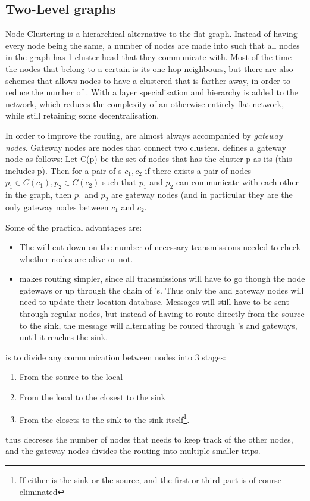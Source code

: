\subsection{Two-Level graphs}
\label{cluster methods}
Node Clustering is a hierarchical alternative to the flat graph. Instead of having every node being the same, a number of nodes are made into \ch such that all nodes in the graph has 1 cluster head that they communicate with. Most of the time the nodes that belong to a certain \ch is its one-hop neighbours, but there are also schemes that allows nodes to have a clustered that is farther away, in order to reduce the number of \ch. With \ch a layer specialisation and hierarchy is added to the network, which reduces the complexity of an otherwise entirely flat network, while still retaining some decentralisation.

In order to improve the routing, \ch are almost always accompanied by \emph{gateway nodes}. Gateway nodes are nodes that connect two clusters. \cite{spanners} defines a gateway node as follows:
Let C(p) be the set of nodes that has the cluster p as its \ch (this includes p). Then for a pair of \ch s $c_1, c_2$ if there exists a pair of nodes $p_1 \in C(c_1), p_2 \in C(c_2)$ such that $p_1$ and $p_2$ can communicate with each other in the graph, then $p_1$ and $p_2$ are gateway nodes (and in particular they are the only gateway nodes between $c_1$ and $c_2$.  

Some of the practical advantages are:
\begin{itemize}
\item The \ch will cut down on the number of necessary transmissions needed to check whether nodes are alive or not.
\item \ch makes routing simpler, since all transmissions will have to go though the node gateways or up through the chain of \ch's. Thus only the \ch and gateway nodes will need to update their location database. Messages will still have to be sent through regular nodes, but instead of having to route directly from the source to the sink, the message will alternating be routed through \ch's and gateways, until it reaches the sink.
\end{itemize}

\ch is to divide any communication between nodes into 3 stages:
\begin{enumerate}
\item From the source to the local \ch 
\item From the local \ch to the \ch closest to the sink
\item From the \ch closets to the sink to the sink itself\footnote{If either \ch is the sink or the source, and the first or third part is of course eliminated}.
\end{enumerate}
 \ch thus decreses the number of nodes that needs to keep track of the other nodes, and the gateway nodes divides the routing into multiple smaller trips.  

